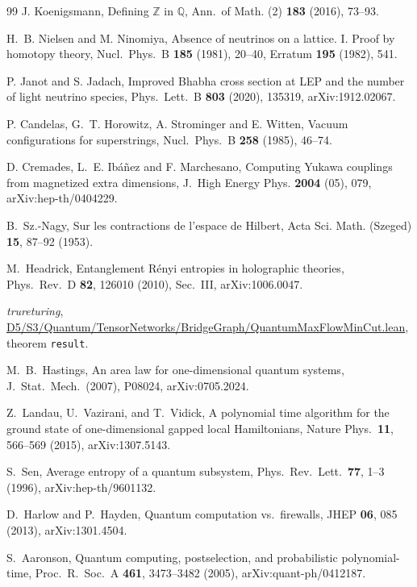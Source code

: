 \documentclass[aps,pra,onecolumn,superscriptaddress,nofootinbib,10pt]{revtex4-2}
\theoremstyle{definition}
\theoremstyle{remark}
\begin{document}
\begin{thebibliography}{99}
 J. Koenigsmann, Defining $\mathbb Z$ in $\mathbb Q$, Ann.\ of Math. (2) \textbf{183} (2016), 73--93.

 H.~B. Nielsen and M. Ninomiya, Absence of neutrinos on a lattice. I. Proof by homotopy theory, Nucl.\ Phys.\ B \textbf{185} (1981), 20--40, Erratum \textbf{195} (1982), 541.

 P. Janot and S. Jadach, Improved Bhabha cross section at LEP and the number of light neutrino species, Phys.\ Lett.\ B \textbf{803} (2020), 135319, arXiv:1912.02067.

 P. Candelas, G.~T. Horowitz, A. Strominger and E. Witten, Vacuum configurations for superstrings, Nucl.\ Phys.\ B \textbf{258} (1985), 46--74.

 D. Cremades, L.~E. Ib\'a\~nez and F. Marchesano, Computing Yukawa couplings from magnetized extra dimensions, J.\ High Energy Phys. \textbf{2004} (05), 079, arXiv:hep-th/0404229.

 B.~Sz.-Nagy, Sur les contractions de l'espace de Hilbert, Acta Sci. Math. (Szeged) \textbf{15}, 87--92 (1953).

 M.~Headrick, Entanglement R\'enyi entropies in holographic theories, Phys.\ Rev.\ D \textbf{82}, 126010 (2010), Sec.~III, arXiv:1006.0047.

 \emph{trureturing}, \href{https://github.com/the-omega-institute/trureturing/blob/9d18ab6b4d228a968377db110b46198742421a3d/D5/S3/Quantum/TensorNetworks/BridgeGraph/QuantumMaxFlowMinCut.lean}{D5/S3/Quantum/TensorNetworks/BridgeGraph/QuantumMaxFlowMinCut.lean}, theorem \texttt{result}.

 M.~B.~Hastings, An area law for one-dimensional quantum systems, J.\ Stat.\ Mech.\ (2007), P08024, arXiv:0705.2024.

 Z.~Landau, U.~Vazirani, and T.~Vidick, A polynomial time algorithm for the ground state of one-dimensional gapped local Hamiltonians, Nature Phys.\ \textbf{11}, 566--569 (2015), arXiv:1307.5143.

 S.~Sen, Average entropy of a quantum subsystem, Phys.\ Rev.\ Lett.\ \textbf{77}, 1--3 (1996), arXiv:hep-th/9601132.

 D.~Harlow and P.~Hayden, Quantum computation vs.\ firewalls, JHEP \textbf{06}, 085 (2013), arXiv:1301.4504.

 S.~Aaronson, Quantum computing, postselection, and probabilistic polynomial-time, Proc.\ R.\ Soc.\ A \textbf{461}, 3473--3482 (2005), arXiv:quant-ph/0412187.


\end{thebibliography}
\end{document}
